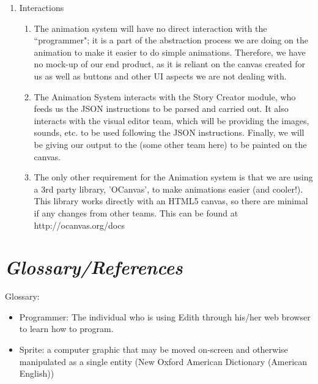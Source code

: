 \documentclass[12pt]{article}
\begin{document}
\begin{enumerate}
\item Interactions
\begin{enumerate}
\item The animation system will have no direct interaction with the ``programmer"; it is a part of the abstraction process we are doing on the animation to make it easier to do simple animations. Therefore, we have no mock-up of our end product, as it is reliant on the canvas created for us as well as buttons and other UI aspects we are not dealing with.
\item The Animation System interacts with the Story Creator module, who feeds us the JSON instructions to be parsed and carried out. It also interacts with the visual editor team, which will be providing the images, sounds, etc. to be used following the JSON instructions. Finally, we will be giving our output to the (some other team here) to be painted on the canvas.
\item The only other requirement for the Animation system is that we are using a 3rd party library, 'OCanvas', to make animations easier (and cooler!). This library works directly with an HTML5 canvas, so there are minimal if any changes from other teams. This can be found at http://ocanvas.org/docs

\end{enumerate}



  \end{enumerate}


\section{\emph{Glossary/References}}
Glossary:
\begin{itemize}
	\item Programmer: The individual who is using Edith through his/her web browser to learn how to program.
	\item Sprite: a computer graphic that may be moved on-screen and otherwise manipulated as a single entity (New Oxford American Dictionary (American English))
\end{itemize}
	

	
\end{document}
